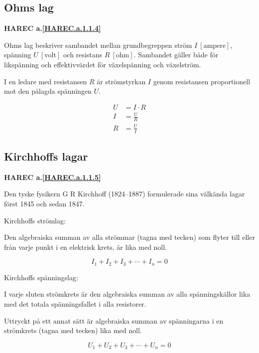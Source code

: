 \subsection{Ohms lag}
\textbf{HAREC a.\ref{HAREC.a.1.1.4}\label{myHAREC.a.1.1.4}}

Ohms lag beskriver sambandet mellan grundbegreppen ström
\(I\ \mathrm{[ampere]}\), spänning \(U\ \mathrm{[volt]}\) och resistans
\(R\ \mathrm{[ohm]}\).
Sambandet gäller både för likspänning och effektivvärdet för växelspänning och
växelström.

I en ledare med resistansen \(R\) är strömstyrkan \(I\) genom resistansen
proportionell mot den pålagda spänningen \(U\).

\begin{align*}
  U &= I \cdot R\\
  I &= \frac{U}{R}\\
  R &= \frac{U}{I}
\end{align*}

\subsection{Kirchhoffs lagar}
\textbf{HAREC a.\ref{HAREC.a.1.1.5}\label{myHAREC.a.1.1.5}}

Den tyske fysikern G R Kirchhoff (1824--1887) formulerade sina välkända lagar
först 1845 och sedan 1847.

Kirchhoffs strömlag:

 Den algebraiska summan av alla strömmar (tagna med tecken) som flyter
 till eller från varje punkt i en elektrisk krets, är lika med noll.

\begin{equation*}
  I_1 + I_2 + I_3 + \cdots + I_n = 0
\end{equation*}

Kirchhoffs spänningslag:

I varje sluten strömkrets är den algebraiska summan av alla spänningskällor lika
med det totala spänningsfallet i alla resistorer.

Uttryckt på ett annat sätt är algebraiska summan av spänningarna i en
strömkrets (tagna med tecken) lika med noll.

\begin{equation*}
  U_1 + U_2 + U_3 + \cdots + U_n = 0
\end{equation*}


